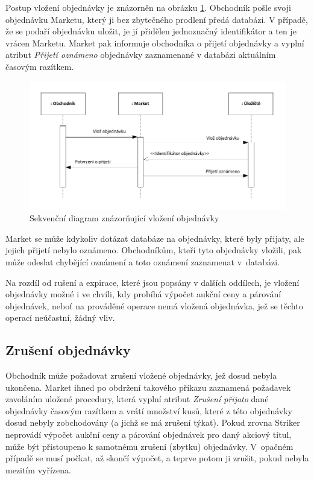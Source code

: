 \documentclass[thesis=M,czech]{FITthesis}[2012/06/26]
\begin{document}
Postup vložení objednávky je znázorněn na obrázku \ref{fig:seq-insert-order-anal}. Obchodník pošle svoji objednávku Marketu, který 
ji bez zbytečného prodlení předá databázi. V případě, že se podaří objednávku uložit, je jí přidělen jednoznačný identifikátor 
a ten je vrácen Marketu. Market pak informuje obchodníka o přijetí objednávky a vyplní atribut \textit{Přijetí oznámeno} 
objednávky zaznamenané v databázi aktuálním časovým razítkem.

\begin{figure}\centering
	\includegraphics[width=\textwidth]{images/seq-insert-order-anal} 
	\caption[Diagram vložení objednávky]{Sekvenční diagram znázorňující vložení objednávky}\label{fig:seq-insert-order-anal}
\end{figure}

Market se může kdykoliv dotázat databáze na objednávky, které byly přijaty, ale jejich přijetí nebylo oznámeno. Obchodníkům, 
kteří tyto objednávky vložili, pak může odeslat chybějící oznámení a toto oznámení zaznamenat v~databázi.

Na rozdíl od rušení a expirace, které jsou popsány v dalších oddílech, je vložení objednávky možné i ve chvíli, kdy probíhá výpočet aukční 
ceny a párování objednávek, neboť na prováděné operace nemá vložená objednávka, jež se těchto operací neúčastní, žádný vliv.


\subsection{Zrušení objednávky}

Obchodník může požadovat zrušení vložené objednávky, jež dosud nebyla ukončena. Market ihned po obdržení takového příkazu zaznamená
požadavek zavoláním uložené procedury, která vyplní atribut \textit{Zrušení přijato} dané objednávky časovým razítkem a vrátí množství kusů, 
které z této objednávky dosud nebyly zobchodovány (a jichž se má zrušení týkat). Pokud zrovna Striker neprovádí výpočet aukční ceny 
a párování objednávek pro daný akciový titul, může být přistoupeno k samotnému zrušení (zbytku) objednávky. V~opačném
případě se musí počkat, až skončí výpočet, a teprve potom ji zrušit, pokud nebyla mezitím vyřízena.
\end{document}
